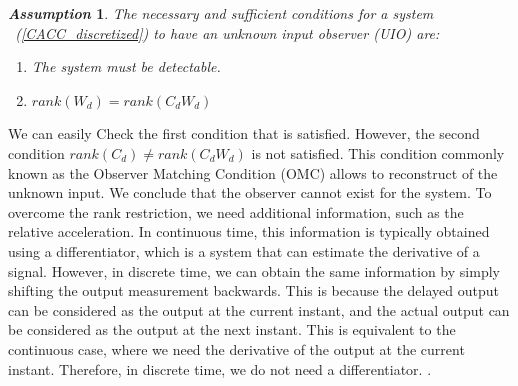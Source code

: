 \documentclass[letterpaper, 10 pt, conference]{ieeeconf}  %
\def\eqref#1{(\ref{#1})}
\newtheorem{assumption}{\it Assumption}%
\begin{document}
\begin{assumption}
The necessary and sufficient conditions for a system  ~\eqref{CACC_discretized} to have an unknown input observer (UIO) are:
\begin{enumerate}
    \item The system must be detectable.
    \item $rank(W_d) = rank(C_{d}W_{d})$
\end{enumerate}

\end{assumption}

We can easily Check the first condition that is satisfied. 
However, the second condition $rank(C_d) \neq rank(C_{d}W_{d})$ is not satisfied. This condition commonly known as the Observer Matching Condition (OMC) allows to reconstruct of the unknown input. We conclude that the observer cannot exist for the system. 
{\color{red}
To overcome the rank restriction, we need additional information, such as the relative acceleration. In continuous time, this information is typically obtained using a differentiator, which is a system that can estimate the derivative of a signal. However, in discrete time, we can obtain the same information by simply shifting the output measurement backwards. This is because the delayed output can be considered as the output at the current instant, and the actual output can be considered as the output at the next instant. This is equivalent to the continuous case, where we need the derivative of the output at the current instant. Therefore, in discrete time, we do not need a differentiator.
.}
\end{document}
